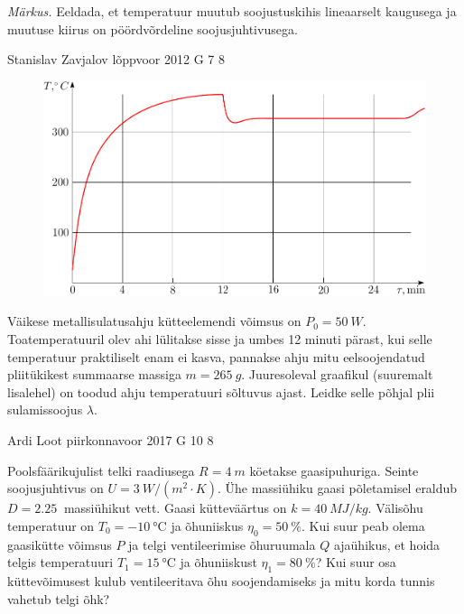 \documentclass[11pt, twoside]{article}
\begin{document}
{{\emph{Märkus.} Eeldada, et temperatuur muutub soojustuskihis lineaarselt
kaugusega ja muutuse kiirus on pöördvõrdeline soojusjuhtivusega. 
\fi
}

{Stanislav Zavjalov} %
{lõppvoor} %
{2012} %
{G 7} %
{8} %
{
\ifStatement
\begin{figure}%
\includegraphics[width=\linewidth]{2012-v3g-07-ahi_graafik}%
\end{figure}
Väikese metallisulatusahju kütteelemendi võimsus on $P_0 = \SI{50}{W}$.
Toatemperatuuril olev ahi lülitakse sisse ja umbes 12 minuti pärast,
kui selle temperatuur praktiliselt enam ei kasva, pannakse ahju mitu
eelsoojendatud pliitükikest summaarse massiga $m = \SI{265}{g}$. Juuresoleval graafikul (suuremalt
lisalehel) on toodud
ahju temperatuuri sõltuvus ajast. Leidke selle põhjal plii sulamissoojus
$\lambda$.
\fi
}

{Ardi Loot} %
{piirkonnavoor} %
{2017} %
{G 10} %
{8} %
{
\ifStatement
Poolsfäärikujulist telki raadiusega $R=\SI{4}{m}$ köetakse
gaasipuhuriga. Seinte soojusjuhtivus on $U=\SI{3}{W/\left(m^{2}\cdot K\right)}$.
Ühe massiühiku gaasi põletamisel eraldub $D=\SI{2.25}{}$ massiühikut vett. Gaasi kütteväärtus on $k=\SI{40}{MJ/kg}$. Välisõhu temperatuur on $T_{0}=\SI{-10}{\celsius}$
ja õhuniiskus $\eta_{0}=\SI{50}{\percent}.$ Kui suur peab olema gaasikütte
võimsus $P$ ja telgi ventileerimise õhuruumala $Q$ ajaühikus, et hoida telgis
temperatuuri $T_{1}=\SI{15}{\celsius}$ ja õhuniiskust $\eta_{1}=\SI{80}{\percent}$?
Kui suur osa küttevõimusest kulub ventileeritava õhu soojendamiseks
ja mitu korda tunnis vahetub telgi õhk?

}}
\end{document}
